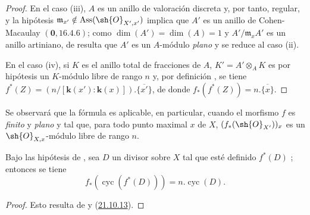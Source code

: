 \begin{proof}
En el caso (iii), $A$ es un anillo de valoración discreta y, por tanto, regular, y la hipótesis $\mathfrak{m}_{x'}\notin\operatorname{Ass}(\sh{O}_{X',x'})$ implica que $A'$ es un anillo de Cohen-Macaulay $(\mathbf{0},16.4.6)$;
como $\dim(A')=\dim(A)=1$ y $A'/\mathfrak{m}_xA'$ es un anillo artiniano, de  resulta que $A'$ es un $A$-módulo \emph{plano} y se reduce al caso (ii).

En el caso (iv), si $K$ es el anillo total de fracciones de $A$, $K'=A'\otimes_AK$ es por hipótesis un $K$-módulo libre de rango $n$ y, por definición , se tiene
$f^*(Z)=(n/[\boldsymbol{k}(x'): \boldsymbol{k}(x)]).\overline{\{x'\}}$,
de donde $f_*(f^*(Z))=n.\overline{\{x\}}$.
\end{proof}

Se observará que la fórmula  es aplicable, en particular, cuando el morfismo $f$ es \emph{finito} y \emph{plano} y tal que, para todo punto maximal $x$ de $X$, $(f_*(\sh{O}_{X'}))_x$ es un $\sh{O}_{X,x}$-módulo libre de rango $n$.

\begin{corollary}[21.10.19]
\label{IV.21.10.19}
Bajo las hipótesis de , sea $D$ un divisor sobre $X$ tal que esté definido $f^*(D)$ ; entonces se tiene
\[
\label{IV.21.10.19.1}
  f_*(\operatorname{cyc}(f^*(D)))=n.\operatorname{cyc}(D).
  \tag{21.10.19.1}
\]
\end{corollary}

\begin{proof}
Esto resulta de  y (\hyperref[IV.21.10.13bis]{21.10.13}).
\end{proof}
